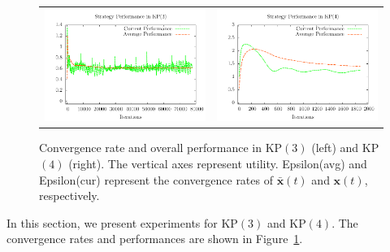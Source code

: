 \documentclass{aamas2014}
\newcommand{\bx}{\mathbf{x}}
\begin{document}
\begin{figure}[t]
\begin{center}
\begin{tabular}{cc}
\includegraphics[scale=0.7]{figs/sfrd3-perf}    & \includegraphics[scale=0.7]{figs/sfrd4-perf} \\
\end{tabular}
\end{center}
\caption{Convergence rate and overall performance in KP$(3)$ (left) and KP$(4)$ (right). 
The vertical axes represent utility. 
Epsilon(avg) and Epsilon(cur) represent the convergence rates
of $\bar{\bx}(t)$ and $\bx(t)$, respectively. \label{fig:sfrd34}}
\end{figure}

In this section, we present experiments for KP$(3)$ and KP$(4)$.  The convergence rates and performances are shown in 
Figure~\ref{fig:sfrd34}.
\end{document}
